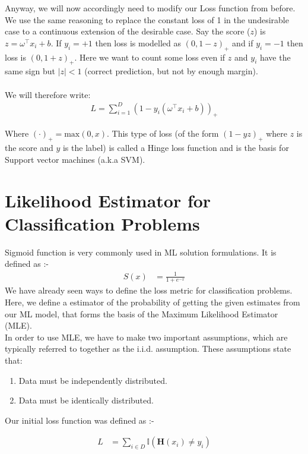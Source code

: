 \documentclass[12pt]{article}
\begin{document}
Anyway, we will now accordingly need to modify our Loss function from before. We use the same reasoning to replace the constant loss of 1 in the undesirable case to a continuous extension of the desirable case. Say the score ($z$) is $z = \omega^{\top}x_i + b$. If $y_i = +1$ then loss is modelled as $(0,1-z)_+$ and if $y_i = -1$ then loss is $(0,1+z)_+$. Here we want to count some loss even if $z$ and $y_i$ have the same sign but $|z|<1$ (correct prediction, but not by enough margin).
\\\\
We will therefore write:
\begin{align}
    L = \sum_{i=1}^{D}\left( 1-y_i(\omega^{\top}x_i + b)\right)_+
\end{align}

Where $(\cdot)_+ = \textrm{max}(0,x)$. This type of loss (of the form $(1-yz)_+$ where $z$ is the score and $y$ is the label) is called a Hinge loss function and is the basis for Support vector machines (a.k.a SVM).

\section{Likelihood Estimator for Classification Problems}

Sigmoid function is very commonly used in ML solution formulations. It is defined as :-\\
\begin{align*}
    S(x) &= \frac{1}{1+e^{-x}}
\end{align*}
We have already seen ways to define the loss metric for classification problems. Here, we define a estimator of the probability of getting the given estimates from our ML model, that forms the basis of the Maximum Likelihood Estimator (MLE).\\
In order to use MLE, we have to make two important assumptions, which are typically referred to together as the i.i.d. assumption. These assumptions state that:
\begin{enumerate}
    \item Data must be independently distributed.
    \item Data must be identically distributed.
\end{enumerate}

Our initial loss function was defined as :-

\begin{align*}
    L &= \sum_{i \in D} \mathbb{I}(\mathbf{H}(x_i)\neq y_i)
\end{align*}
\end{document}
